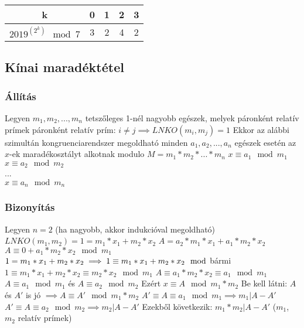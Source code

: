 \documentclass[12pt,a4paper]{article}
\begin{document}
\begin{table}[h]
\centering
\begin{tabular}{|c|c|c|c|c|}
	\hline
	k & 0 & 1 & 2 & 3 \\
	\hline
	$2019^{(2^k)} \mod 7$ & 3 & 2 & 4 & 2 \\
	\hline
\end{tabular}
\end{table}

\pagebreak

\subsection{Kínai maradéktétel}

\subsubsection{Állítás}

\begin{outline}
	\1 Legyen $m_1,m_2,...,m_n$ tetszőleges 1-nél nagyobb egészek, melyek páronként relatív prímek
		\2 páronként relatív prím: $i \ne j \implies LNKO(m_i,m_j)=1$
	\1 Ekkor
		\2 az alábbi szimultán kongruenciarendszer megoldható minden $a_1,a_2,...,a_n$ egészek esetén
		\2 az $x$-ek maradékosztályt alkotnak modulo $M=m_1*m_2*...*m_n$
	\1 $x \equiv a_1 \mod m_1$\\
	$x \equiv a_2 \mod m_2$\\
	...\\
	$x \equiv a_n \mod m_n$
\end{outline}

\subsubsection{Bizonyítás}

\begin{outline}
	\1 Legyen $n=2$ (ha nagyobb, akkor indukcióval megoldható)
	\1 $LNKO(m_1,m_2)=1=m_1*x_1+m_2*x_2$
	\1 $A=a_2*m_1*x_1+a_1*m_2*x_2$
		\2 $A \equiv 0+a_1*m_2*x_2 \mod m_1$
		\2 $1=m_1*x_1+m_2*x_2 \implies 1 \equiv m_1*x_1+m_2*x_2 \mod $bármi
		\2 $1 \equiv m_1*x_1+m_2*x_2 \equiv m_2*x_2 \mod m_1$
		\2 $A \equiv a_1*m_2*x_2 \equiv a_1 \mod m_1$
	\1 $A \equiv a_1 \mod m_1$ és $A \equiv a_2 \mod m_2$
	\1 Ezért $x \equiv A \mod m_1*m_2$
	\1 Be kell látni: $A$ és $A'$ is jó $\implies A \equiv A' \mod m_1*m_2$
		\2 $A' \equiv A \equiv a_1 \mod m_1 \implies m_1 | A-A'$
		\2 $A' \equiv A \equiv a_2 \mod m_2 \implies m_2 | A-A'$
		\2 Ezekből következik: $m_1*m_2|A-A'$ ($m_1$, $m_2$ relatív prímek)
\end{outline}
\end{document}
